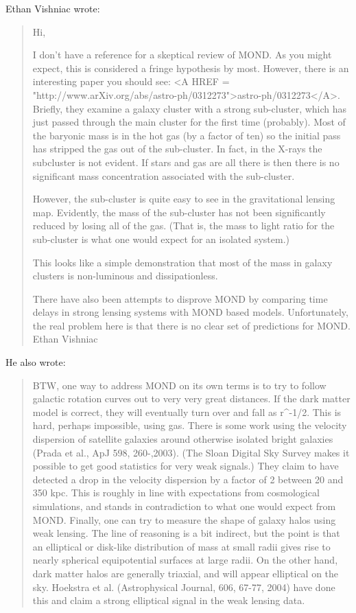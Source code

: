 Ethan Vishniac wrote:
\begin{quote}
Hi,

    I don't have a reference for a skeptical review of MOND.  As you 
might
expect, this is considered a fringe hypothesis by most.  However, there 
is
an interesting paper you should see: 
<A HREF = "http://www.arXiv.org/abs/astro-ph/0312273">astro-ph/0312273</A>.
    Briefly, they examine a galaxy cluster with a strong sub-cluster, 
which has
just passed through the main cluster for the first time (probably).  
Most of the
baryonic mass is in the hot gas (by a factor of ten) so the initial 
pass has
stripped the gas out of the sub-cluster.  In fact, in the X-rays the 
subcluster is
not evident.  If stars and gas are all there is then there is no 
significant
mass concentration associated with the sub-cluster.

     However, the sub-cluster is quite easy to see in the gravitational 
lensing
map.  Evidently, the mass of the sub-cluster has not been significantly 
reduced
by losing all of the gas.   (That is, the mass to light ratio for the 
sub-cluster is what
one would expect for an isolated system.)

    This looks like a simple demonstration that most of the mass in 
galaxy clusters
is non-luminous and dissipationless.

    There have also been attempts to disprove MOND by comparing time 
delays in
strong lensing systems with MOND based models.  Unfortunately, the real 
problem
here is that there is no clear set of predictions for MOND.
         Ethan Vishniac
\end{quote}

He also wrote:

\begin{quote}
    BTW, one way to address MOND on its own terms is to try to follow 
galactic
rotation curves out to very very great distances.  If the dark matter 
model is
correct, they will eventually turn over and fall as r^{-1/2}.  
This is hard, perhaps
impossible, using gas.  There is some work using the velocity 
dispersion of
satellite galaxies around otherwise isolated bright galaxies (Prada et 
al.,
ApJ 598, 260-,2003).  (The Sloan Digital Sky Survey makes it possible to
get good statistics for very weak signals.)  They claim to have detected
a drop in the velocity dispersion by a factor of 2 between 20 and 350
kpc.  This is roughly in line with expectations from cosmological 
simulations,
and stands in contradiction to what one would expect from MOND.
   Finally, one can try to measure the shape of galaxy halos using weak 
lensing.
The line of reasoning is a bit indirect, but the point is that an 
elliptical or disk-like
distribution of mass at small radii gives rise to nearly spherical 
equipotential
surfaces at large radii.  On the other hand, dark matter halos are 
generally
triaxial, and will appear elliptical on the sky.   Hoekstra et al. 
(Astrophysical Journal,
606, 67-77, 2004) have done this and claim a strong elliptical signal 
in the
weak lensing data.
\end{quote}

